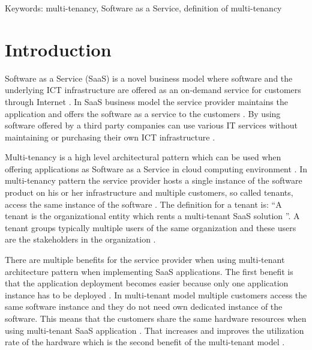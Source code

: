 \documentclass[conference]{sasmoota2017}
\begin{document}

Keywords: multi-tenancy, Software as a Service, definition of multi-tenancy



\IEEEpeerreviewmaketitle



\section{Introduction}

Software as a Service (SaaS) is a novel business model where software and the underlying ICT infrastructure are offered as an on-demand service for customers through Internet \cite{Bezemer:2010:MaintenanceDream}. In SaaS business model the service provider maintains the application and offers the software as a service to the customers \cite{Bezemer:2010:MaintenanceDream}. By using software offered by a third party companies can use various IT services without maintaining or purchasing their own ICT infrastructure \cite{Bezemer:2010:MaintenanceDream}. 

Multi-tenancy is a high level architectural pattern which can be used when offering applications as Software as a Service in cloud computing environment \cite{Kabbedijk2015:Defining}. In multi-tenancy pattern the service provider hosts a single instance of the software product on his or her infrastructure and multiple customers, so called tenants, access the same instance of the software \cite{Bezemer:2010:MaintenanceDream}. The definition for a tenant is: “A tenant is the organizational entity which rents a multi-tenant SaaS solution \cite{Bezemer:2010:MaintenanceDream}”. A tenant groups typically multiple users of the same organization and these users are the stakeholders in the organization \cite{Bezemer:2010:MaintenanceDream}. 

There are multiple benefits for the service provider when using multi-tenant architecture pattern when implementing SaaS applications. The first benefit is that the application deployment becomes easier because only one application instance has to be deployed \cite{Bezemer:2010:MaintenanceDream}. In multi-tenant model multiple customers access the same software instance and they do not need own dedicated instance of the software. This means that the customers share the same hardware resources when using multi-tenant SaaS application \cite{Guo:2007:FrameworkForNative}. That increases and improves the utilization rate of the hardware which is the second benefit of the multi-tenant model \cite{Bezemer:2010:MaintenanceDream}. 
\end{document}
